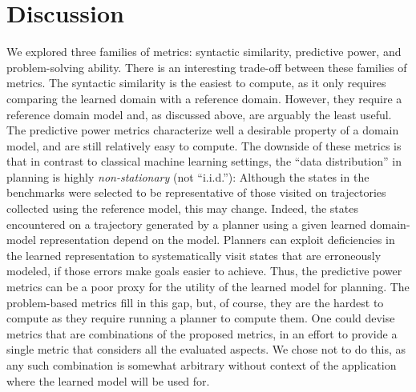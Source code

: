 \documentclass[letterpaper]{article} %
\newif\ifaddcomments
\newcommand{\roni}[1]{\ifaddcomments{\textcolor{red}{[Roni: #1]}}\fi}
\begin{document}
\section{Discussion}
We explored three families of metrics: syntactic similarity, predictive power, and problem-solving ability. 
There is an interesting trade-off between these families of metrics. 
The syntactic similarity is the easiest to compute, as it only requires comparing the learned domain with a reference domain. However, they require a reference domain model and, as discussed above, are arguably the least useful. 
The predictive power metrics characterize well a desirable property of a domain model, and are still relatively easy to compute. 
The downside of these metrics is that in contrast to classical machine learning settings, the ``data distribution'' in planning is highly \emph{non-stationary} (not ``i.i.d.''):  Although the states in the benchmarks were selected to be representative of those visited on trajectories collected using the reference model, this may change. Indeed, the states encountered on a trajectory generated by a planner using a given learned domain-model representation depend on the model. Planners can exploit deficiencies in the learned representation to systematically visit states that are erroneously modeled, if those errors make goals easier to achieve. Thus, the predictive power metrics can be a poor proxy for the utility of the learned model for planning. The problem-based metrics fill in this gap, but, of course, they are the hardest to compute as they require running a planner to compute them. 
One could devise metrics that are combinations of the proposed metrics, in an effort to provide a single metric that considers all the evaluated aspects. We chose not to do this, as any such combination is somewhat arbitrary without context of the application where the learned model will be used for. 
\roni{Added above 2 sentences for AAAI reviewer}



\end{document}
